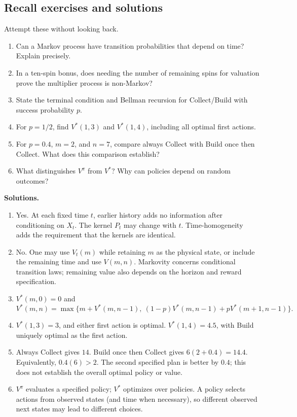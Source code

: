 \documentclass[11pt]{article}
\theoremstyle{remark}\newtheorem{remark}[definition]{Remark}
\begin{document}
\subsection{Recall exercises and solutions}
Attempt these without looking back.
\begin{enumerate}
\item Can a Markov process have transition probabilities that depend on time? Explain precisely.
\item In a ten-spin bonus, does needing the number of remaining spins for valuation prove the multiplier process is non-Markov?
\item State the terminal condition and Bellman recursion for Collect/Build with success probability $p$.
\item For $p=1/2$, find $V^*(1,3)$ and $V^*(1,4)$, including all optimal first actions.
\item For $p=0.4$, $m=2$, and $n=7$, compare always Collect with Build once then Collect. What does this comparison establish?
\item What distinguishes $V^\pi$ from $V^*$? Why can policies depend on random outcomes?
\end{enumerate}
\textbf{Solutions.}
\begin{enumerate}
\item Yes. At each fixed time $t$, earlier history adds no information after conditioning on $X_t$. The kernel $P_t$ may change with $t$. Time-homogeneity adds the requirement that the kernels are identical.
\item No. One may use $V_t(m)$ while retaining $m$ as the physical state, or include the remaining time and use $V(m,n)$. Markovity concerns conditional transition laws; remaining value also depends on the horizon and reward specification.
\item $V^*(m,0)=0$ and
\[
V^*(m,n)=\max\{m+V^*(m,n-1),\ (1-p)V^*(m,n-1)+pV^*(m+1,n-1)\}.
\]
\item $V^*(1,3)=3$, and either first action is optimal. $V^*(1,4)=4.5$, with Build uniquely optimal as the first action.
\item Always Collect gives $14$. Build once then Collect gives $6(2+0.4)=14.4$. Equivalently, $0.4(6)>2$. The second specified plan is better by $0.4$; this does not establish the overall optimal policy or value.
\item $V^\pi$ evaluates a specified policy; $V^*$ optimizes over policies. A policy selects actions from observed states (and time when necessary), so different observed next states may lead to different choices.
\end{enumerate}
\end{document}
